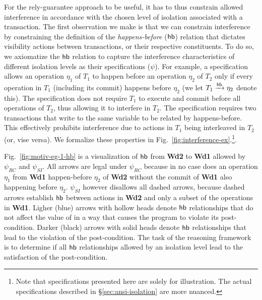 For the rely-guarantee approach to be useful, it has to thus constrain
allowed interference in accordance with the chosen level of isolation
associated with a transaction. The first observation we make is
that we can constrain interference by constraining the definition of
the \emph{happens-before} ($\textsf{hb}$) relation that dictates visibility
actions between transactions, or their respective constituents.  To do
so, we axiomatize the $\textsf{hb}$ relation to capture the interference
characteristics of different isolation levels as their specifications
($\psi$). For example, a  specification allows an
operation $\eta_1$ of $T_1$ to happen before an operation $\eta_2$ of
$T_2$ only if every operation in $T_1$ (including its commit) happens
before $\eta_2$ (we let $T_1 \xrightarrow{\textsf{hb}} \eta_2$ denote this). The 
specification does not require $T_1$ to execute and commit before all
operations of $T_2$, thus allowing it to interfere in $T_2$. The
 specification requires two transactions that
write to the same variable to be related by happens-before.  This
effectively prohibits interference due to actions in $T_1$ being
interleaved in $T_2$ (or, vise versa).  We formalize these properties
in Fig.~\ref{fig:interference-ex}.\footnote{Note that specifications
  presented here are solely for illustration. The actual
  specifications described in \S\ref{sec:ansi-isolation} are more
  nuanced.}.


Fig.~\ref{fig:motiv-eg-1-hb} is a visualization of $\textsf{hb}$ 
from {\bf Wd2} to {\bf Wd1} allowed by $\psi_{RC}$ and $\psi_{SI}$. All
arrows are legal under $\psi_{RC}$ because in no case does an operation
$\eta_1$ from {\bf Wd1} happen-before $\eta_2$ of {\bf Wd2} without the commit
of {\bf Wd1} also happening before $\eta_2$. $\psi_{SI}$ however disallows
all dashed arrows, because dashed arrows establish $\textsf{hb}$ between actions in {\bf Wd2}
and only a subset of the operations in {\bf Wd1}. Ligher (blue) arrows with
hollow heads denote $\textsf{hb}$ relationships that do not affect the value
of  in a way that causes the program to violate its
post-condition.  Darker (black) arrows with solid heads denote $\textsf{hb}$
relationships that lead to the violation of the post-condition. The task of
the reasoning framework is to determine if all $\textsf{hb}$ relationships
allowed by an isolation level lead to the satisfaction of the
post-condition.


